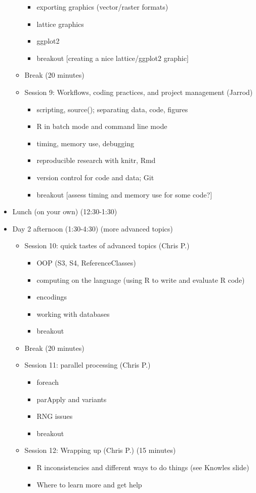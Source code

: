 \documentclass[12pt]{article}\usepackage{graphicx, color}
\begin{document}
\begin{itemize}
\begin{itemize}
\begin{itemize}
\item exporting graphics (vector/raster formats)
\item lattice graphics
\item ggplot2
\item breakout {[}creating a nice lattice/ggplot2 graphic{]}
\end{itemize}
\item Break (20 minutes)
\item Session 9: Workflows, coding practices, and project management (Jarrod)

\begin{itemize}
\item scripting, source(); separating data, code, figures
\item R in batch mode and command line mode
\item timing, memory use, debugging
\item reproducible research with knitr, Rmd
\item version control for code and data; Git
\item breakout {[}assess timing and memory use for some code?{]}
\end{itemize}
\end{itemize}
\item Lunch (on your own) (12:30-1:30)
\item Day 2 afternoon (1:30-4:30) (more advanced topics) 

\begin{itemize}
\item Session 10: quick tastes of advanced topics (Chris P.)

\begin{itemize}
\item OOP (S3, S4, ReferenceClasses)
\item computing on the language (using R to write and evaluate R code)
\item encodings
\item working with databases
\item breakout 
\end{itemize}
\item Break (20 minutes)
\item Session 11: parallel processing (Chris P.)

\begin{itemize}
\item foreach
\item parApply and variants
\item RNG issues
\item breakout 
\end{itemize}
\item Session 12: Wrapping up (Chris P.) (15 minutes)

\begin{itemize}
\item R inconsistencies and different ways to do things (see Knowles slide)
\item Where to learn more and get help\end{itemize}
\end{itemize}
\end{itemize}
\end{document}
